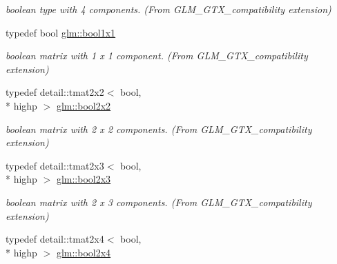 \begin{DoxyCompactItemize}
\begin{DoxyCompactList}\small\item\em boolean type with 4 components. (From G\-L\-M\-\_\-\-G\-T\-X\-\_\-compatibility extension) \end{DoxyCompactList}\item 
\hypertarget{group__gtx__compatibility_ga98d9d3da22aebc872ba38ce5afa0eff7}{typedef bool \hyperlink{group__gtx__compatibility_ga98d9d3da22aebc872ba38ce5afa0eff7}{glm\-::bool1x1}}\label{group__gtx__compatibility_ga98d9d3da22aebc872ba38ce5afa0eff7}

\begin{DoxyCompactList}\small\item\em boolean matrix with 1 x 1 component. (From G\-L\-M\-\_\-\-G\-T\-X\-\_\-compatibility extension) \end{DoxyCompactList}\item 
\hypertarget{group__gtx__compatibility_ga44cd09c0dad9ea163f038a342555867f}{typedef detail\-::tmat2x2$<$ bool, \\*
highp $>$ \hyperlink{group__gtx__compatibility_ga44cd09c0dad9ea163f038a342555867f}{glm\-::bool2x2}}\label{group__gtx__compatibility_ga44cd09c0dad9ea163f038a342555867f}

\begin{DoxyCompactList}\small\item\em boolean matrix with 2 x 2 components. (From G\-L\-M\-\_\-\-G\-T\-X\-\_\-compatibility extension) \end{DoxyCompactList}\item 
\hypertarget{group__gtx__compatibility_ga75013772bb088d107a1c1a994e7f9b14}{typedef detail\-::tmat2x3$<$ bool, \\*
highp $>$ \hyperlink{group__gtx__compatibility_ga75013772bb088d107a1c1a994e7f9b14}{glm\-::bool2x3}}\label{group__gtx__compatibility_ga75013772bb088d107a1c1a994e7f9b14}

\begin{DoxyCompactList}\small\item\em boolean matrix with 2 x 3 components. (From G\-L\-M\-\_\-\-G\-T\-X\-\_\-compatibility extension) \end{DoxyCompactList}\item 
\hypertarget{group__gtx__compatibility_gaf24096d8a88d274b94002386a3fcab0c}{typedef detail\-::tmat2x4$<$ bool, \\*
highp $>$ \hyperlink{group__gtx__compatibility_gaf24096d8a88d274b94002386a3fcab0c}{glm\-::bool2x4}}\label{group__gtx__compatibility_gaf24096d8a88d274b94002386a3fcab0c}


\end{DoxyCompactItemize}
